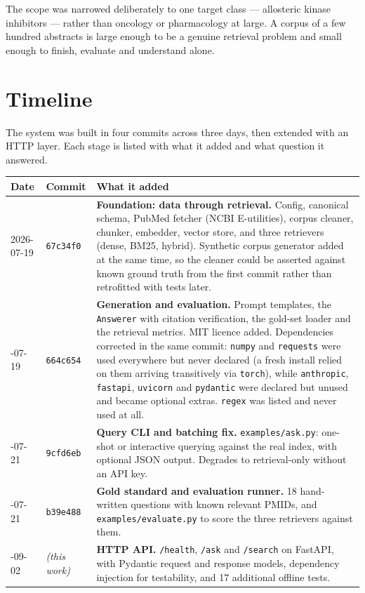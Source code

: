 \documentclass[a4paper,11pt]{article}
\newcommand{\code}[1]{\texttt{\small #1}}
\begin{document}
\noindent
The scope was narrowed deliberately to one target class --- allosteric kinase
inhibitors --- rather than oncology or pharmacology at large. A corpus of a few
hundred abstracts is large enough to be a genuine retrieval problem and small
enough to finish, evaluate and understand alone.

\section{Timeline}

The system was built in four commits across three days, then extended with an
HTTP layer. Each stage is listed with what it added and what question it
answered.

\begin{longtable}{@{}p{2.05cm}p{2.6cm}p{9.6cm}@{}}
\toprule
\textbf{Date} & \textbf{Commit} & \textbf{What it added} \\
\midrule
\endhead
2026-07-19 & \code{67c34f0} &
  \textbf{Foundation: data through retrieval.}
  Config, canonical schema, PubMed fetcher (NCBI E-utilities), corpus cleaner,
  chunker, embedder, vector store, and three retrievers (dense, BM25, hybrid).
  Synthetic corpus generator added at the same time, so the cleaner could be
  asserted against known ground truth from the first commit rather than
  retrofitted with tests later. \\
\addlinespace
2026-07-19 & \code{664c654} &
  \textbf{Generation and evaluation.}
  Prompt templates, the \code{Answerer} with citation verification, the gold-set
  loader and the retrieval metrics. MIT licence added. Dependencies corrected in
  the same commit: \code{numpy} and \code{requests} were used everywhere but never
  declared (a fresh install relied on them arriving transitively via
  \code{torch}), while \code{anthropic}, \code{fastapi}, \code{uvicorn} and
  \code{pydantic} were declared but unused and became optional extras.
  \code{regex} was listed and never used at all. \\
\addlinespace
2026-07-21 & \code{9cfd6eb} &
  \textbf{Query CLI and batching fix.}
  \code{examples/ask.py}: one-shot or interactive querying against the real
  index, with optional JSON output. Degrades to retrieval-only without an API
  key. \\
\addlinespace
2026-07-21 & \code{b39e488} &
  \textbf{Gold standard and evaluation runner.}
  18 hand-written questions with known relevant PMIDs, and
  \code{examples/evaluate.py} to score the three retrievers against them. \\
\addlinespace
2026-09-02 & \emph{(this work)} &
  \textbf{HTTP API.}
  \code{/health}, \code{/ask} and \code{/search} on FastAPI, with Pydantic
  request and response models, dependency injection for testability, and 17
  additional offline tests. \\
\bottomrule
\end{longtable}
\end{document}
